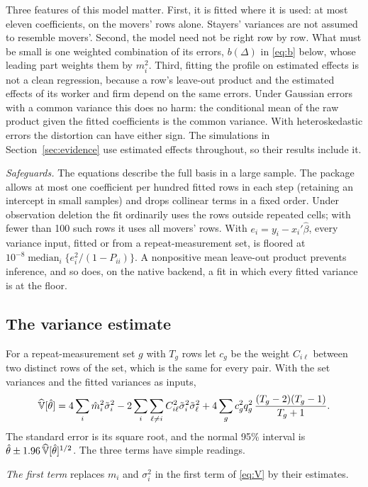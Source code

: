 Three features of this model matter. First, it is fitted where it is used: at most
eleven coefficients, on the movers' rows alone. Stayers' variances are not assumed to
resemble movers'. Second, the model need not be right row by row. What must be small
is one weighted combination of its errors, $b(\Delta)$ in \eqref{eq:b} below, whose
leading part weights them by $m_i^2$. Third, fitting the profile on estimated effects
is not a clean regression, because a row's leave-out product and the estimated effects
of its worker and firm depend on the same errors. Under Gaussian errors with a common
variance this does no harm: the conditional mean of the raw product given the fitted
coefficients is the common variance. With heteroskedastic errors the distortion can
have either sign. The simulations in Section~\ref{sec:evidence} use estimated effects
throughout, so their results include it.

\emph{Safeguards.} The equations describe the full basis in a large sample. The package
allows at most one coefficient per hundred fitted rows in each step (retaining an
intercept in small samples) and drops collinear terms in a fixed order. Under
observation deletion the fit ordinarily uses the rows outside repeated cells; with
fewer than 100 such rows it uses all movers' rows. With $e_i=y_i-x_i'\hat\beta$, every
variance input, fitted or from a repeat-measurement set, is floored at
$10^{-8}\operatorname{median}_i\{e_i^2/(1-P_{ii})\}$. A nonpositive mean leave-out
product prevents inference, and so does, on the native backend, a fit in which every
fitted variance is at the floor.

\subsection{The variance estimate}
For a repeat-measurement set $g$ with $T_g$ rows let $c_g$ be the weight
$C_{i\ell}$ between two distinct rows of the set, which is the same for every pair.
With the set variances and the fitted variances as inputs,
\begin{equation}\label{eq:Vhat}
 \widehat{\mathbb{V}}[\hat\theta]
  =4\sum_i\hat m_i^2\tilde\sigma_i^2
  -2\sum_i\sum_{\ell\ne i}C_{i\ell}^2\tilde\sigma_i^2\tilde\sigma_\ell^2
  +4\sum_g c_g^2q_g^2\,\frac{(T_g-2)(T_g-1)}{T_g+1}.
\end{equation}
The standard error is its square root, and the normal 95\% interval is
$\hat\theta\pm1.96\,\widehat{\mathbb{V}}[\hat\theta]^{1/2}$. The three terms have simple
readings.

\emph{The first term} replaces $m_i$ and $\sigma_i^2$ in the first term of
\eqref{eq:V} by their estimates.

